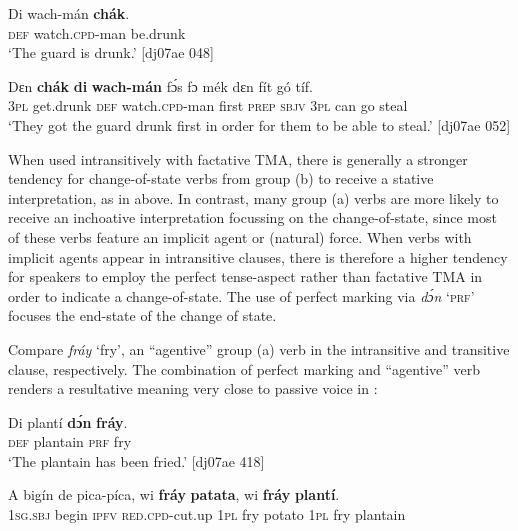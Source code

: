 \ea%
    \label{ex:key:1110}
    \gll Di  wach-mán    \textbf{chák}.\\
\textsc{def}  watch.\textsc{cpd}{}-man  be.drunk\\

\glt ‘The guard is drunk.’ [dj07ae 048]
\z


\ea%
    \label{ex:key:1111}
    \gll Dɛn    \textbf{chák}    \textbf{di}  \textbf{wach-mán}    fɔ́s  fɔ  mék
dɛn  fít  gó  tíf.\\
\textsc{3pl}    get.drunk  \textsc{def}  watch.\textsc{cpd}{}-man  first  \textsc{prep}  \textsc{sbjv}  
\textsc{3pl}  can  go  steal\\

\glt ‘They got the guard drunk first in order for them to be able to steal.’ [dj07ae 052]
\z

When used intransitively with factative TMA, there is generally a stronger tendency for change-of-state verbs from group (b) to receive a stative interpretation, as in  above. In contrast, many group (a) verbs are more likely to receive an inchoative interpretation focussing on the change-of-state, since most of these verbs feature an implicit agent or (natural) force. When verbs with implicit agents appear in intransitive clauses, there is therefore a higher tendency for speakers to employ the perfect tense-aspect rather than factative TMA in order to indicate a change-of-state. The use of perfect marking via \textit{dɔ́n} ‘\textsc{prf}’ focuses the end-state of the change of state. 


Compare \textit{fráy} ‘fry’, an “agentive” group (a) verb in the intransitive and transitive clause, respectively. The combination of perfect marking and “agentive” verb renders a resultative meaning very close to passive voice in : 



\ea%
    \label{ex:key:1112}
    \gll Di  plantí  \textbf{dɔ́n}  \textbf{fráy}.\\
\textsc{def}  plantain  \textsc{prf}  fry\\

\glt ‘The plantain has been fried.’ [dj07ae 418]
\z


\ea%
    \label{ex:key:1113}
    \gll A    bigín  de  pica-píca,    wi  \textbf{fráy}  \textbf{patata},
wi  \textbf{fráy}  \textbf{plantí}.\\
\textsc{1sg.sbj}  begin  \textsc{ipfv}  \textsc{red.cpd}{}-cut.up  \textsc{1pl}  fry  potato
\textsc{1pl}  fry  plantain\\

